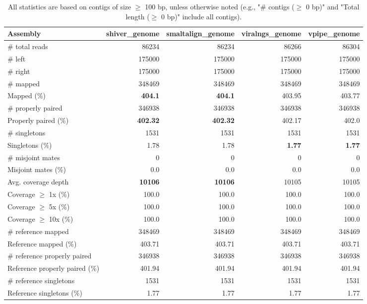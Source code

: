 \documentclass[12pt,a4paper]{article}
\begin{document}
\begin{table}[ht]
\begin{center}
\caption{All statistics are based on contigs of size $\geq$ 100 bp, unless otherwise noted (e.g., "\# contigs ($\geq$ 0 bp)" and "Total length ($\geq$ 0 bp)" include all contigs).}
\begin{tabular}{|l*{4}{|r}|}
\hline
Assembly & shiver\_genome & smaltalign\_genome & viralngs\_genome & vpipe\_genome \\ \hline
\# total reads & 86234 & 86234 & 86266 & 86304 \\ \hline
\# left & 175000 & 175000 & 175000 & 175000 \\ \hline
\# right & 175000 & 175000 & 175000 & 175000 \\ \hline
\# mapped & 348469 & 348469 & 348469 & 348469 \\ \hline
Mapped (\%) & {\bf 404.1} & {\bf 404.1} & 403.95 & 403.77 \\ \hline
\# properly paired & 346938 & 346938 & 346938 & 346938 \\ \hline
Properly paired (\%) & {\bf 402.32} & {\bf 402.32} & 402.17 & 402.0 \\ \hline
\# singletons & 1531 & 1531 & 1531 & 1531 \\ \hline
Singletons (\%) & 1.78 & 1.78 & {\bf 1.77} & {\bf 1.77} \\ \hline
\# misjoint mates & 0 & 0 & 0 & 0 \\ \hline
Misjoint mates (\%) & 0.0 & 0.0 & 0.0 & 0.0 \\ \hline
Avg. coverage depth & {\bf 10106} & {\bf 10106} & 10105 & 10105 \\ \hline
Coverage $\geq$ 1x (\%) & 100.0 & 100.0 & 100.0 & 100.0 \\ \hline
Coverage $\geq$ 5x (\%) & 100.0 & 100.0 & 100.0 & 100.0 \\ \hline
Coverage $\geq$ 10x (\%) & 100.0 & 100.0 & 100.0 & 100.0 \\ \hline
\# reference mapped & 348469 & 348469 & 348469 & 348469 \\ \hline
Reference mapped (\%) & 403.71 & 403.71 & 403.71 & 403.71 \\ \hline
\# reference properly paired & 346938 & 346938 & 346938 & 346938 \\ \hline
Reference properly paired (\%) & 401.94 & 401.94 & 401.94 & 401.94 \\ \hline
\# reference singletons & 1531 & 1531 & 1531 & 1531 \\ \hline
Reference singletons (\%) & 1.77 & 1.77 & 1.77 & 1.77 \\ \hline

\end{tabular}
\end{center}
\end{table}
\end{document}
